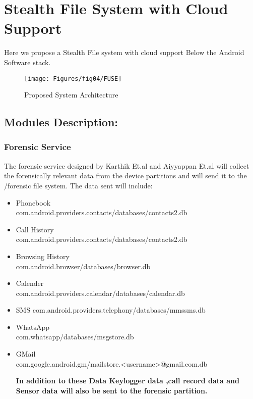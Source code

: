 \chapter{Stealth File System with Cloud Support}
\label{chap:proposal}

Here we propose a Stealth File system with cloud support  Below the Android  Software stack.
\begin{figure}[h]
   \centering
   \texttt{[image: Figures/fig04/FUSE]}
   \caption{Proposed System Architecture}
  \end{figure}
 \section{ Modules Description:}
 
\subsection{Forensic Service}
The forensic service designed by Karthik\cite{Karthik2016} Et.al and Aiyyappan Et.al\cite{Aiyyappan2015} will collect the forensically relevant data from the device partitions and will send it to the /forensic file system. The data sent will include:
\begin{itemize}
\item Phonebook\\
  com.android.providers.contacts/databases/contacts2.db
\item Call History\\ com.android.providers.contacts/databases/contacts2.db
\item Browsing History\\ com.android.browser/databases/browser.db
\item Calender\\ com.android.providers.calendar/databases/calendar.db
\item SMS com.android.providers.telephony/databases/mmssms.db
\item WhatsApp\\ com.whatsapp/databases/msgstore.db
\item GMail\\ com.google.android.gm/mailstore.<username>@gmail.com.db

\textbf{In addition to these Data Keylogger data ,call record data and Sensor data will also be sent to the forensic partition.}
\end{itemize}
